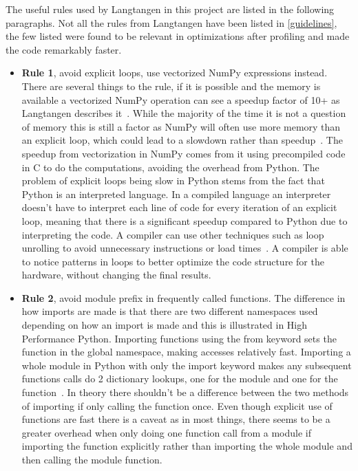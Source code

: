 \documentclass[12pt, a4paper]{article}
\begin{document}
The useful rules used by Langtangen in this project are listed in the following paragraphs.
Not all the rules from Langtangen have been listed in \ref{guidelines}, the few listed were found to be relevant in optimizations after profiling and made the code remarkably faster.
\begin{itemize}\label{guidelines}
    \item \textbf{Rule 1}, avoid explicit loops, use vectorized NumPy expressions instead.
    There are several things to the rule, if it is possible and the memory is available a vectorized NumPy operation can see a speedup factor of 10+ as Langtangen describes it~\cite{NumpyArray}.
    While the majority of the time it is not a question of memory this is still a factor as NumPy will often use more memory than an explicit loop, which could lead to a slowdown rather than speedup~\cite{NumpyVectorization}.
    The speedup from vectorization in NumPy comes from it using precompiled code in C to do the computations, avoiding the overhead from Python.
    The problem of explicit loops being slow in Python stems from the fact that Python is an interpreted language.
    In a compiled language an interpreter doesn't have to interpret each line of code for every iteration of an explicit loop, meaning that there is a significant speedup compared to Python due to interpreting the code.
    A compiler can use other techniques such as loop unrolling to avoid unnecessary instructions or load times~\cite{wiki:LoopUnroll}.
    A compiler is able to notice patterns in loops to better optimize the code structure for the hardware, without changing the final results.

    \item \textbf{Rule 2}, avoid module prefix in frequently called functions.
    The difference in how imports are made is that there are two different namespaces used depending on how an import is made and this is illustrated in High Performance Python.
    Importing functions using the from keyword sets the function in the global namespace, making accesses relatively fast.
    Importing a whole module in Python with only the import keyword makes any subsequent functions calls do 2 dictionary lookups, one for the module and one for the function~\cite{oreillyCh4}.
    In theory there shouldn't be a difference between the two methods of importing if only calling the function once.
    Even though explicit use of functions are fast there is a caveat as in most things, there seems to be a greater overhead when only doing one function call from a module if importing the function explicitly rather than importing the whole module and then calling the module function.


\end{itemize}
\end{document}
